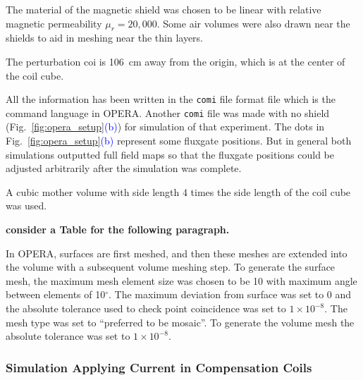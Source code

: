 The material of the magnetic shield was chosen to be linear with
relative magnetic permeability $\mu_r=20,000$.  Some air volumes were
also drawn near the shields to aid in meshing near the thin layers.

The perturbation coi is 106~cm away from the origin, which is at the
center of the coil cube.

All the information has been written in the {\tt comi} file format
file which is the command language in OPERA. Another {\tt comi} file
was made with no shield
(Fig.~\ref{fig:opera_setup}\textcolor{blue}{(b)}) for simulation of
that experiment.  The dots in
Fig.~\ref{fig:opera_setup}\textcolor{blue}{(b)} represent some
fluxgate positions.  But in general both simulations outputted full
field maps so that the fluxgate positions could be adjusted
arbitrarily after the simulation was complete.

A cubic mother volume with side length 4 times the side length of the
coil cube was used.

{\bf consider a Table for the following paragraph.}

In OPERA, surfaces are first meshed, and then these meshes are
extended into the volume with a subsequent volume meshing step.  To
generate the surface mesh, the maximum mesh element size was chosen to
be 10 with maximum angle between elements of 10$^\circ$. The maximum
deviation from surface was set to 0 and the absolute tolerance used to
check point coincidence was set to $1\times10^{-8}$. The mesh
type was set to ``preferred to be mosaic''. To generate the volume
mesh the absolute tolerance was set to $1\times10^{-8}$.

\subsubsection{Simulation Applying Current in Compensation Coils}\label{sec:mSim}


